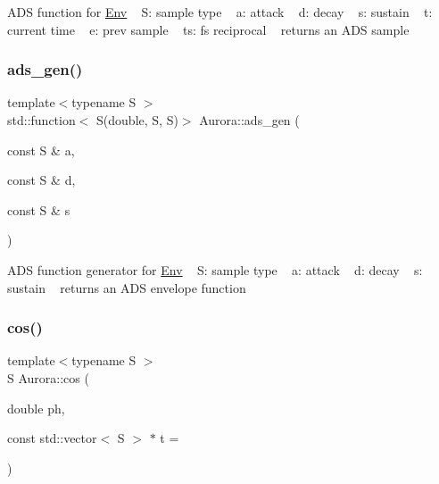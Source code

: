 A\+DS function for \hyperlink{class_aurora_1_1_env}{Env} ~\newline
S\+: sample type ~\newline
a\+: attack ~\newline
d\+: decay ~\newline
s\+: sustain ~\newline
t\+: current time ~\newline
e\+: prev sample ~\newline
ts\+: fs reciprocal ~\newline
returns an A\+DS sample \mbox{\label{namespace_aurora_ac7d13365b103aa497998c2bb23ad7f13}} 
\subsubsection{\texorpdfstring{ads\+\_\+gen()}{ads\_gen()}}
{\footnotesize\ttfamily template$<$typename S $>$ \\
std\+::function$<$ S(double, S, S)$>$ Aurora\+::ads\+\_\+gen (\begin{DoxyParamCaption}\item[{const S \&}]{a,  }\item[{const S \&}]{d,  }\item[{const S \&}]{s }\end{DoxyParamCaption})}

A\+DS function generator for \hyperlink{class_aurora_1_1_env}{Env} ~\newline
S\+: sample type ~\newline
a\+: attack ~\newline
d\+: decay ~\newline
s\+: sustain ~\newline
returns an A\+DS envelope function \mbox{\label{namespace_aurora_a0269c3758ab62d6a910cd8f7ace7fba2}} 
\subsubsection{\texorpdfstring{cos()}{cos()}}
{\footnotesize\ttfamily template$<$typename S $>$ \\
S Aurora\+::cos (\begin{DoxyParamCaption}\item[{double}]{ph,  }\item[{const std\+::vector$<$ S $>$ $\ast$}]{t = {} }\end{DoxyParamCaption})\hspace{0.3cm}{\ttfamily [inline]}}


